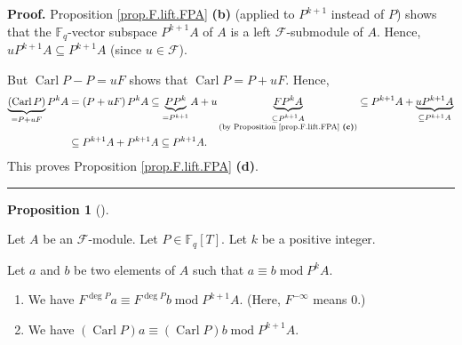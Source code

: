 \documentclass[numbers=enddot,12pt,final,onecolumn,notitlepage]{scrartcl}%
\theoremstyle{definition}
\newtheorem{prop}[theo]{Proposition}
\newenvironment{proposition}[1][]
{\begin{prop}[#1]\begin{leftbar}}
{\end{leftbar}\end{prop}}
\newenvironment{proof}[1][Proof]{\noindent\textbf{#1.} }{\ \rule{0.5em}{0.5em}}
\begin{document}
\begin{proof}
Proposition \ref{prop.F.lift.FPA} \textbf{(b)} (applied to $P^{k+1}$ instead
of $P$) shows that the $\mathbb{F}_{q}$-vector subspace $P^{k+1}A$ of $A$ is a
left $\mathcal{F}$-submodule of $A$. Hence, $uP^{k+1}A\subseteq P^{k+1}A$
(since $u\in\mathcal{F}$).

But $\operatorname*{Carl}P-P=uF$ shows that $\operatorname*{Carl}P=P+uF$.
Hence,%
\begin{align*}
\underbrace{\left(  \operatorname*{Carl}P\right)  }_{=P+uF}P^{k}A  &  =\left(
P+uF\right)  P^{k}A\subseteq\underbrace{PP^{k}}_{=P^{k+1}}%
A+u\underbrace{FP^{k}A}_{\substack{\subseteq P^{k+1}A\\\text{(by Proposition
\ref{prop.F.lift.FPA} \textbf{(c)})}}}\subseteq P^{k+1}A+\underbrace{uP^{k+1}%
A}_{\subseteq P^{k+1}A}\\
&  \subseteq P^{k+1}A+P^{k+1}A\subseteq P^{k+1}A.
\end{align*}
This proves Proposition \ref{prop.F.lift.FPA} \textbf{(d)}.
\end{proof}

\begin{proposition}
\label{prop.F.lift.lift-P}Let $A$ be an $\mathcal{F}$-module. Let
$P\in\mathbb{F}_{q}\left[  T\right]  $. Let $k$ be a positive integer.

Let $a$ and $b$ be two elements of $A$ such that $a\equiv b\operatorname{mod}%
P^{k}A$.

\begin{enumerate}
\item[\textbf{(a)}] We have $F^{\deg P}a\equiv F^{\deg P}b\operatorname{mod}%
P^{k+1}A$. (Here, $F^{-\infty}$ means $0$.)

\item[\textbf{(b)}] We have $\left(  \operatorname*{Carl}P\right)
a\equiv\left(  \operatorname*{Carl}P\right)  b\operatorname{mod}P^{k+1}A$.
\end{enumerate}
\end{proposition}
\end{document}
